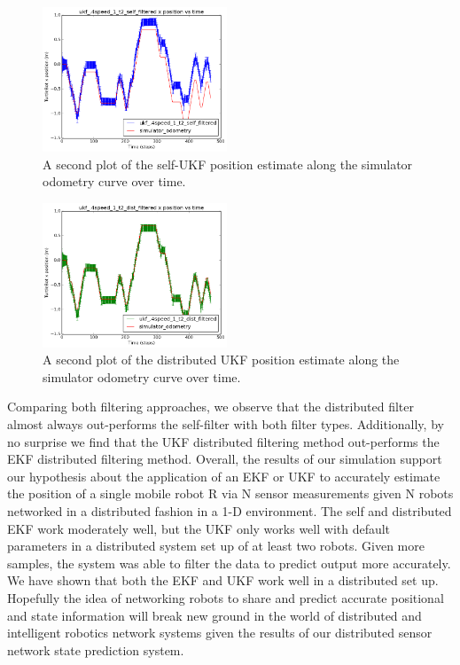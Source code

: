 \documentclass[conference]{IEEEtran} \usepackage[T1]{fontenc} \usepackage[backend=biber, style=ieee]{biblatex}
\begin{document}
\begin{figure}
\centering 
\includegraphics[width=0.49\textwidth]{ukf_4speed_1_t2_self_filtered_pos_err_graph}
\caption {A second plot of the self-UKF position estimate along the simulator 
odometry curve over time.}
\label{pic13} 
\end{figure}


\begin{figure}
\centering 
\includegraphics[width=0.49\textwidth]{ukf_4speed_1_t2_dist_filtered_pos_err_graph}
\caption {A second plot of the distributed UKF position estimate along the simulator odometry curve over time.}
\label{pic14} 
\end{figure}

Comparing both filtering approaches, we observe that the distributed filter almost always out-performs the self-filter 
with both filter types. Additionally, by no surprise we find that the UKF distributed filtering method out-performs the EKF distributed
filtering method. Overall, the results of our simulation support our hypothesis about the application of an EKF or UKF to accurately
estimate the position of a single mobile robot R via N sensor measurements given N robots networked in a distributed fashion in a 1-D environment. 
The self and distributed EKF work moderately well, but the UKF only works well with default parameters in a distributed system set up of at least 
two robots. Given more samples, the system was able to filter the data to predict output more accurately. We have shown that both the EKF 
and UKF work well in a distributed set up. Hopefully the idea of networking robots to share and predict accurate positional and state information will break new ground in the world of distributed and intelligent robotics network systems given the results of our distributed sensor network state prediction
system.
\end{document}
